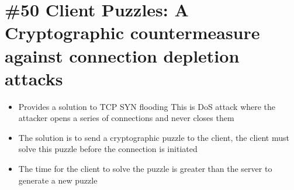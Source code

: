 \section{\#50 Client Puzzles: A Cryptographic countermeasure against connection depletion attacks}
\begin{itemize}
	\item Provides a solution to TCP SYN flooding
	\subitem This is DoS attack where the attacker opens a series of connections and never closes them
	\item The solution is to send a cryptographic puzzle to the client, the client must solve this puzzle before the connection is initiated
	\item The time for the client to solve the puzzle is greater than the server to generate a new puzzle
\end{itemize}